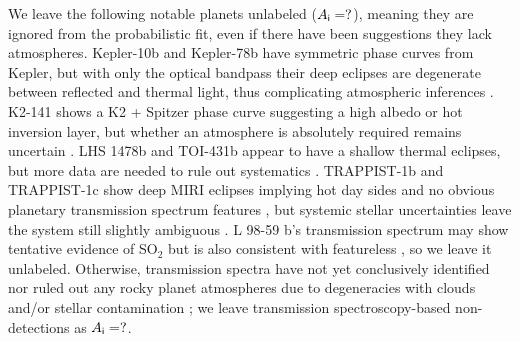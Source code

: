 \documentclass[modern,linenumbers,trackchanges]{aastex7}
\begin{document}
We leave the following notable planets unlabeled ($A_{\sf i} = ?$), meaning they are ignored from the probabilistic fit, even if there have been suggestions they lack atmospheres. 
Kepler-10b and Kepler-78b have symmetric phase curves from Kepler, but with only the optical bandpass their deep eclipses are degenerate between reflected and thermal light, thus complicating atmospheric inferences \citep{sanchis-ojedaTransitsOccultationsEarthsized2013, estevesChangingPhasesAlien2015a, huSemianalyticalModelVisiblewavelength2015, singhProbingKeplersHottest2022}. K2-141 shows a K2 + Spitzer phase curve suggesting a high albedo or hot inversion layer, but whether an atmosphere is absolutely required remains uncertain \citep{singhProbingKeplersHottest2022, ziebaK2SpitzerPhase2022}. LHS 1478b and TOI-431b appear to have a shallow thermal eclipses, but more data are needed to rule out systematics \citep{augustHotRocksSurvey2025, monaghanLow45Mm2025a}. TRAPPIST-1b and TRAPPIST-1c show deep MIRI eclipses implying hot day sides \citep{greeneThermalEmissionEarthsized2023, ihConstrainingThicknessTRAPPIST12023, ziebaNoThickCarbon2023, ducrotCombinedAnalysis1282025} and no obvious planetary transmission spectrum features \citep{limAtmosphericReconnaissanceTRAPPIST12023, radicaPromisePerilStellar2025, rathckeStellarContaminationCorrection2025}, but systemic stellar uncertainties leave the system still slightly ambiguous \citep{howardCharacterizingNearinfraredSpectra2023, rackhamRobustCorrectionsStellar2024,  fauchezStellarModelsAlso2025}. %
L 98-59 b's transmission spectrum may show tentative evidence of SO$_2$ \citep[possibly from tidally-heated volcanism;][] {seligmanPotentialMeltingExtrasolar2024} but is also consistent with featureless \citep{bello-arufeEvidenceVolcanicAtmosphere2025b}, so we leave it unlabeled. Otherwise, transmission spectra have not yet conclusively identified nor ruled out any rocky planet atmospheres due to degeneracies with clouds \citep{lustig-yaegerMirageCosmicShoreline2019} and/or stellar contamination \citep{mayDoubleTroubleTwo2023, moranHighTideRiptide2023}; we leave transmission spectroscopy-based non-detections as $A_{\sf i} = ?$.
\end{document}

